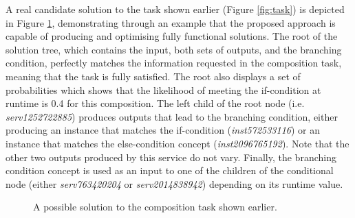 \documentclass[conference]{IEEEtran}
\begin{document}
A real candidate solution to the task shown earlier (Figure \ref{fig:task}) is depicted in Figure \ref{fig:solution}, demonstrating through an example that the proposed approach is capable of producing and optimising fully functional solutions. The root of the solution tree, which contains the input, both sets of outputs, and the branching condition, perfectly matches the information requested in the composition task, meaning that the task is fully satisfied. The root also displays a set of probabilities which shows that the likelihood of meeting the if-condition at runtime is 0.4 for this composition. The left child of the root node (i.e. \textit{serv1252722885}) produces outputs that lead to the branching condition, either producing an instance that matches the if-condition (\textit{inst572533116}) or an instance that matches the else-condition concept (\textit{inst2096765192}). Note that the other two outputs produced by this service do not vary. Finally, the branching condition concept is used as an input to one of the children of the conditional node (either \textit{serv763420204} or \textit{serv2014838942}) depending on its runtime value.

\begin{figure}
\centerline{
}
\caption{A possible solution to the composition task shown earlier.}
\label{fig:solution}
\end{figure}
\end{document}
